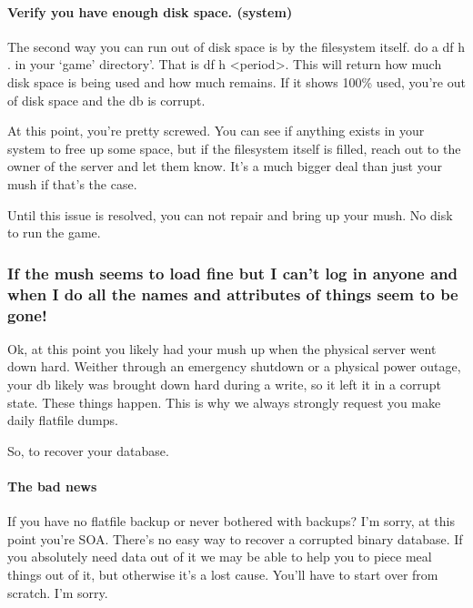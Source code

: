 \documentclass[letterpaper,10pt,english]{sphinxmanual}
\begin{document}
\paragraph{Verify you have enough disk space.  (system)}
\label{\detokenize{troubleshooting:verify-you-have-enough-disk-space-system}}
\sphinxAtStartPar
The second way you can run out of disk space is by the filesystem itself.
do a df \sphinxhyphen{}h . in your ‘game’ directory’.  That is df \sphinxhyphen{}h \textless{}period\textgreater{}.
This will return how much disk space is being used and how much remains.
If it shows 100\% used, you’re out of disk space and the db is corrupt.

\sphinxAtStartPar
At this point, you’re pretty screwed.  You can see if anything exists
in your system to free up some space, but if the filesystem itself
is filled, reach out to the owner of the server and let them know.
It’s a much bigger deal than just your mush if that’s the case.

\sphinxAtStartPar
Until this issue is resolved, you can not repair and bring up your mush.
No disk to run the game.


\subsubsection{If the mush seems to load fine but I can’t log in anyone and when I do all the names and attributes of things seem to be gone!}
\label{\detokenize{troubleshooting:if-the-mush-seems-to-load-fine-but-i-can-t-log-in-anyone-and-when-i-do-all-the-names-and-attributes-of-things-seem-to-be-gone}}
\sphinxAtStartPar
Ok, at this point you likely had your mush up when the physical server
went down hard.  Weither through an emergency shutdown or a physical
power outage, your db likely was brought down hard during a write,
so it left it in a corrupt state.  These things happen.  This is
why we always strongly request you make daily flatfile dumps.

\sphinxAtStartPar
So, to recover your database.


\paragraph{The bad news}
\label{\detokenize{troubleshooting:the-bad-news}}
\sphinxAtStartPar
If you have no flatfile backup or never bothered with backups?
I’m sorry, at this point you’re SOA.  There’s no easy way to
recover a corrupted binary database.  If you absolutely need
data out of it we may be able to help you to piece meal things
out of it, but otherwise it’s a lost cause.  You’ll have to start
over from scratch.  I’m sorry.
\end{document}
